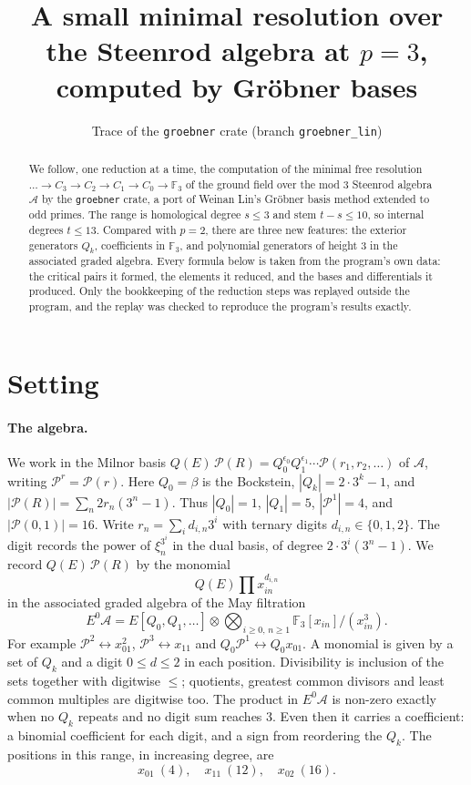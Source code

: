 \documentclass[11pt]{article}
\title{A small minimal resolution over the Steenrod algebra at $p = 3$,\\ computed by Gröbner bases}
\author{Trace of the \texttt{groebner} crate (branch \texttt{groebner\_lin})}
\date{}
\renewcommand{\P}{\mathcal{P}}
\newcommand{\F}{\mathbb{F}_3}
\newcommand{\A}{\mathcal{A}}
\begin{document}
\maketitle

\begin{abstract}
We follow, one reduction at a time, the computation of the minimal free resolution
$\dots \to C_3 \to C_2 \to C_1 \to C_0 \to \F$ of the ground field over the mod $3$ Steenrod
algebra $\A$ by the \texttt{groebner} crate, a port of Weinan Lin's Gröbner basis method
extended to odd primes. The range is homological degree $s \le 3$ and stem $t - s \le 10$, so
internal degrees $t \le 13$. Compared with $p = 2$, there are three new features: the exterior
generators $Q_k$, coefficients in $\F$, and polynomial generators of height $3$ in the
associated graded algebra. Every formula below is taken from the program's own data: the
critical pairs it formed, the elements it reduced, and the bases and differentials it
produced. Only the bookkeeping of the reduction steps was replayed outside the program, and the
replay was checked to reproduce the program's results exactly.
\end{abstract}

\section{Setting}

\paragraph{The algebra.}
We work in the Milnor basis $Q(E)\,\P(R) = Q_0^{\epsilon_0}Q_1^{\epsilon_1}\cdots
\P(r_1, r_2, \dots)$ of $\A$, writing $\P^r = \P(r)$. Here $Q_0 = \beta$ is the Bockstein,
$|Q_k| = 2\cdot 3^k - 1$, and $|\P(R)| = \sum_n 2 r_n (3^n - 1)$. Thus $|Q_0| = 1$, $|Q_1| = 5$,
$|\P^1| = 4$, and $|\P(0,1)| = 16$. Write $r_n = \sum_i d_{i,n} 3^i$ with ternary digits
$d_{i,n} \in \{0, 1, 2\}$. The digit records the power of $\xi_n^{3^i}$ in the dual basis,
of degree $2\cdot 3^i(3^n - 1)$. We record $Q(E)\,\P(R)$ by the monomial
\[ Q(E) \prod x_{in}^{d_{i,n}} \]
in the associated graded algebra of the May filtration
\[ E^0\A = E[Q_0, Q_1, \dots] \otimes \bigotimes_{i \ge 0,\, n \ge 1} \F[x_{in}]/(x_{in}^3). \]
For example $\P^2 \leftrightarrow x_{01}^2$, $\P^3 \leftrightarrow x_{11}$ and
$Q_0\P^1 \leftrightarrow Q_0x_{01}$. A monomial is given by a set of $Q_k$ and a digit
$0 \le d \le 2$ in each position. Divisibility is inclusion of the sets together with digitwise
$\le$; quotients, greatest common divisors and least common multiples are digitwise too. The
product in $E^0\A$ is non-zero exactly when no $Q_k$ repeats and no digit sum reaches $3$. Even
then it carries a coefficient: a binomial coefficient for each digit, and a sign from
reordering the $Q_k$. The positions in this range, in increasing degree, are
\[ x_{01}\ (4),\quad x_{11}\ (12),\quad x_{02}\ (16). \]
\end{document}
